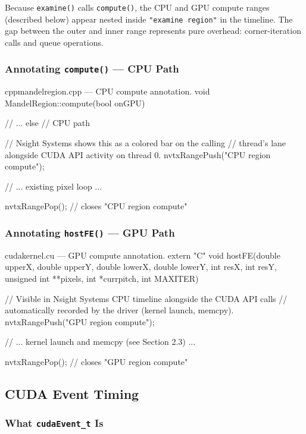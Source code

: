 \documentclass[
	english,
	letterpaper, oneside
]{article}
\begin{document}
Because \texttt{examine()} calls \texttt{compute()}, the CPU and GPU
compute ranges (described below) appear nested inside
\texttt{"examine region"} in the timeline. The gap between the outer and
inner range represents pure overhead: corner-iteration calls and queue
operations.

\subsubsection{Annotating \texttt{compute()} — CPU Path}

\begin{sourcecode}{cpp}{mandelregion.cpp — CPU compute annotation.}
void MandelRegion::compute(bool onGPU)
{
    // ...
    else // CPU path
    {
        // Nsight Systems shows this as a colored bar on the calling
        // thread's lane alongside CUDA API activity on thread 0.
        nvtxRangePush("CPU region compute");

        // ... existing pixel loop ...

        nvtxRangePop(); // closes "CPU region compute"
    }
}
\end{sourcecode}

\subsubsection{Annotating \texttt{hostFE()} — GPU Path}

\begin{sourcecode}{cuda}{kernel.cu — GPU compute annotation.}
extern "C" void hostFE(double upperX, double upperY, double lowerX,
                       double lowerY, int resX, int resY,
                       unsigned int **pixels, int *currpitch, int MAXITER)
{
    // Visible in Nsight Systems CPU timeline alongside the CUDA API calls
    // automatically recorded by the driver (kernel launch, memcpy).
    nvtxRangePush("GPU region compute");

    // ... kernel launch and memcpy (see Section 2.3) ...

    nvtxRangePop(); // closes "GPU region compute"
}
\end{sourcecode}

\subsection{CUDA Event Timing}

\subsubsection{What \texttt{cudaEvent\_t} Is}
\end{document}

